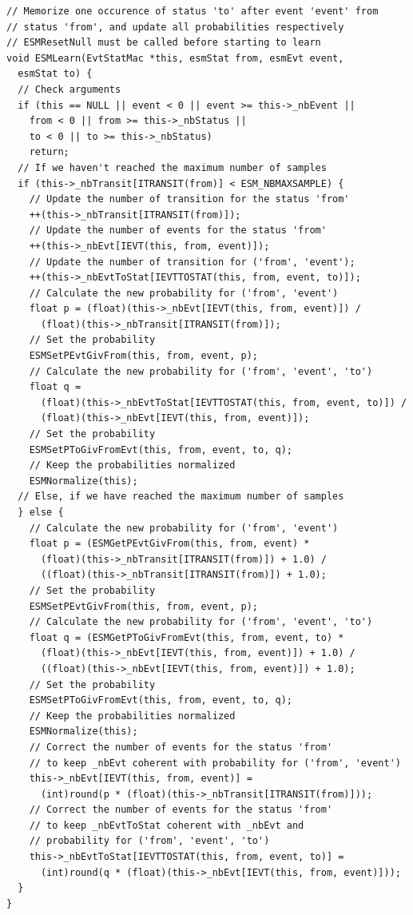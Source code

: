 \documentclass[12pt, a4paper]{article}
\begin{document}
\begin{scriptsize}
\begin{ttfamily}
\begin{lstlisting}
// Memorize one occurence of status 'to' after event 'event' from
// status 'from', and update all probabilities respectively
// ESMResetNull must be called before starting to learn
void ESMLearn(EvtStatMac *this, esmStat from, esmEvt event, 
  esmStat to) {
  // Check arguments
  if (this == NULL || event < 0 || event >= this->_nbEvent ||
    from < 0 || from >= this->_nbStatus ||
    to < 0 || to >= this->_nbStatus)
    return;
  // If we haven't reached the maximum number of samples
  if (this->_nbTransit[ITRANSIT(from)] < ESM_NBMAXSAMPLE) {
    // Update the number of transition for the status 'from'
    ++(this->_nbTransit[ITRANSIT(from)]);
    // Update the number of events for the status 'from'
    ++(this->_nbEvt[IEVT(this, from, event)]);
    // Update the number of transition for ('from', 'event');
    ++(this->_nbEvtToStat[IEVTTOSTAT(this, from, event, to)]);
    // Calculate the new probability for ('from', 'event')
    float p = (float)(this->_nbEvt[IEVT(this, from, event)]) / 
      (float)(this->_nbTransit[ITRANSIT(from)]);
    // Set the probability
    ESMSetPEvtGivFrom(this, from, event, p);
    // Calculate the new probability for ('from', 'event', 'to')
    float q = 
      (float)(this->_nbEvtToStat[IEVTTOSTAT(this, from, event, to)]) / 
      (float)(this->_nbEvt[IEVT(this, from, event)]);
    // Set the probability
    ESMSetPToGivFromEvt(this, from, event, to, q);
    // Keep the probabilities normalized
    ESMNormalize(this);
  // Else, if we have reached the maximum number of samples
  } else {
    // Calculate the new probability for ('from', 'event')
    float p = (ESMGetPEvtGivFrom(this, from, event) * 
      (float)(this->_nbTransit[ITRANSIT(from)]) + 1.0) / 
      ((float)(this->_nbTransit[ITRANSIT(from)]) + 1.0);
    // Set the probability
    ESMSetPEvtGivFrom(this, from, event, p);
    // Calculate the new probability for ('from', 'event', 'to')
    float q = (ESMGetPToGivFromEvt(this, from, event, to) * 
      (float)(this->_nbEvt[IEVT(this, from, event)]) + 1.0) / 
      ((float)(this->_nbEvt[IEVT(this, from, event)]) + 1.0);
    // Set the probability
    ESMSetPToGivFromEvt(this, from, event, to, q);
    // Keep the probabilities normalized
    ESMNormalize(this);
    // Correct the number of events for the status 'from'
    // to keep _nbEvt coherent with probability for ('from', 'event')
    this->_nbEvt[IEVT(this, from, event)] = 
      (int)round(p * (float)(this->_nbTransit[ITRANSIT(from)]));
    // Correct the number of events for the status 'from'
    // to keep _nbEvtToStat coherent with _nbEvt and 
    // probability for ('from', 'event', 'to')
    this->_nbEvtToStat[IEVTTOSTAT(this, from, event, to)] = 
      (int)round(q * (float)(this->_nbEvt[IEVT(this, from, event)]));
  }
}


\end{lstlisting}
\end{ttfamily}
\end{scriptsize}
\end{document}

